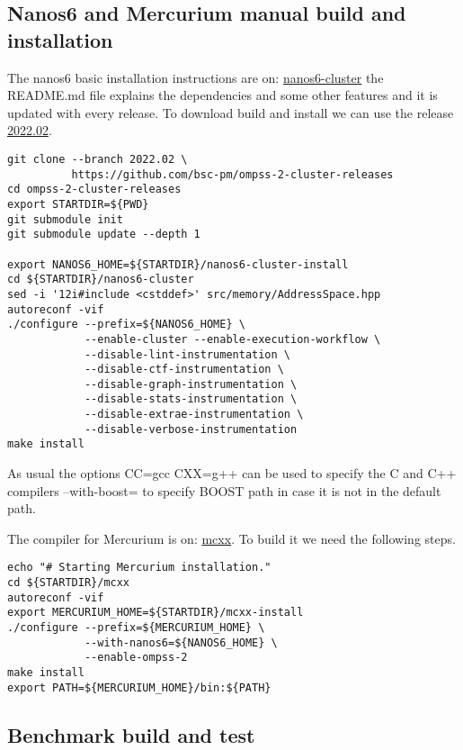 \documentclass{article}
\begin{document}
\subsection{Nanos6 and Mercurium manual build and installation}\label{manuallib}

The nanos6 basic installation instructions are on:
\href{https://github.com/bsc-pm/nanos6-cluster}{nanos6-cluster} the
README.md file explains the dependencies and some other features and
it is updated with every release. To download build and install we can
use the release
\href{https://github.com/bsc-pm/ompss-2-cluster-releases}{2022.02}.

\begin{lstlisting}
git clone --branch 2022.02 \
          https://github.com/bsc-pm/ompss-2-cluster-releases
cd ompss-2-cluster-releases
export STARTDIR=${PWD}
git submodule init
git submodule update --depth 1

export NANOS6_HOME=${STARTDIR}/nanos6-cluster-install
cd ${STARTDIR}/nanos6-cluster
sed -i '12i#include <cstddef>' src/memory/AddressSpace.hpp
autoreconf -vif
./configure --prefix=${NANOS6_HOME} \
            --enable-cluster --enable-execution-workflow \
            --disable-lint-instrumentation \
            --disable-ctf-instrumentation \
            --disable-graph-instrumentation \
            --disable-stats-instrumentation \
            --disable-extrae-instrumentation \
            --disable-verbose-instrumentation
make install
\end{lstlisting}

As usual the options CC=gcc CXX=g++ can be used to specify the C and
C++ compilers --with-boost= to specify BOOST path in case it is not in
the default path.

The compiler for Mercurium is on:
\href{https://github.com/bsc-pm/mcxx}{mcxx}. To build it we need the
following steps.

\begin{lstlisting}
echo "# Starting Mercurium installation."
cd ${STARTDIR}/mcxx
autoreconf -vif
export MERCURIUM_HOME=${STARTDIR}/mcxx-install
./configure --prefix=${MERCURIUM_HOME} \
            --with-nanos6=${NANOS6_HOME} \
            --enable-ompss-2
make install
export PATH=${MERCURIUM_HOME}/bin:${PATH}
\end{lstlisting}

\subsection{Benchmark build and test}\label{manualbench}
\end{document}
